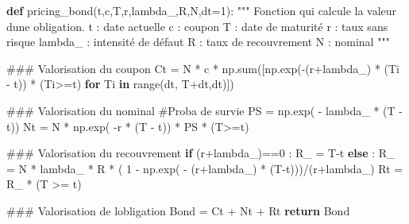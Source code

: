 \documentclass[
  letterpaper,
  DIV=11,
  numbers=noendperiod]{scrartcl}
\newenvironment{Shaded}{\begin{snugshade}}{\end{snugshade}}
\newcommand{\BuiltInTok}[1]{\textcolor[rgb]{0.00,0.23,0.31}{#1}}
\newcommand{\CommentTok}[1]{\textcolor[rgb]{0.37,0.37,0.37}{#1}}
\newcommand{\ControlFlowTok}[1]{\textcolor[rgb]{0.00,0.23,0.31}{\textbf{#1}}}
\newcommand{\DecValTok}[1]{\textcolor[rgb]{0.68,0.00,0.00}{#1}}
\newcommand{\KeywordTok}[1]{\textcolor[rgb]{0.00,0.23,0.31}{\textbf{#1}}}
\newcommand{\NormalTok}[1]{\textcolor[rgb]{0.00,0.23,0.31}{#1}}
\newcommand{\OperatorTok}[1]{\textcolor[rgb]{0.37,0.37,0.37}{#1}}
\begin{document}
\begin{Shaded}
\begin{Highlighting}[]
\KeywordTok{def}\NormalTok{ pricing\_bond(t,c,T,r,lambda\_,R,N,dt}\OperatorTok{=}\DecValTok{1}\NormalTok{):}
    \CommentTok{"""}
\CommentTok{    Fonction qui calcule la valeur d\textquotesingle{}une obligation.}
\CommentTok{    t : date actuelle}
\CommentTok{    c : coupon}
\CommentTok{    T : date de maturité}
\CommentTok{    r : taux sans risque}
\CommentTok{    lambda\_ : intensité de défaut}
\CommentTok{    R : taux de recouvrement}
\CommentTok{    N : nominal}
\CommentTok{    """}

    \CommentTok{\#\#\# Valorisation du coupon}
\NormalTok{    Ct }\OperatorTok{=}\NormalTok{ N }\OperatorTok{*}\NormalTok{ c }\OperatorTok{*}\NormalTok{ np.}\BuiltInTok{sum}\NormalTok{([np.exp(}\OperatorTok{{-}}\NormalTok{(r}\OperatorTok{+}\NormalTok{lambda\_) }\OperatorTok{*}\NormalTok{ (Ti }\OperatorTok{{-}}\NormalTok{ t)) }\OperatorTok{*}\NormalTok{ (Ti}\OperatorTok{\textgreater{}=}\NormalTok{t) }\ControlFlowTok{for}\NormalTok{ Ti }\KeywordTok{in} \BuiltInTok{range}\NormalTok{(dt, T}\OperatorTok{+}\NormalTok{dt,dt)])}

    \CommentTok{\#\#\# Valorisation du nominal}
    \CommentTok{\#Proba de survie}
\NormalTok{    PS }\OperatorTok{=}\NormalTok{ np.exp( }\OperatorTok{{-}}\NormalTok{ lambda\_ }\OperatorTok{*}\NormalTok{ (T }\OperatorTok{{-}}\NormalTok{ t))}
\NormalTok{    Nt }\OperatorTok{=}\NormalTok{ N }\OperatorTok{*}\NormalTok{ np.exp( }\OperatorTok{{-}}\NormalTok{r }\OperatorTok{*}\NormalTok{ (T }\OperatorTok{{-}}\NormalTok{ t)) }\OperatorTok{*}\NormalTok{ PS }\OperatorTok{*}\NormalTok{ (T}\OperatorTok{\textgreater{}=}\NormalTok{t)}

    \CommentTok{\#\#\# Valorisation du recouvrement}
    \ControlFlowTok{if}\NormalTok{ (r}\OperatorTok{+}\NormalTok{lambda\_)}\OperatorTok{==}\DecValTok{0}\NormalTok{ :}
\NormalTok{        R\_ }\OperatorTok{=}\NormalTok{ T}\OperatorTok{{-}}\NormalTok{t}
    \ControlFlowTok{else}\NormalTok{ :}
\NormalTok{        R\_ }\OperatorTok{=}\NormalTok{ N }\OperatorTok{*}\NormalTok{ lambda\_ }\OperatorTok{*}\NormalTok{ R }\OperatorTok{*}\NormalTok{ ( }\DecValTok{1} \OperatorTok{{-}}\NormalTok{ np.exp( }\OperatorTok{{-}}\NormalTok{ (r}\OperatorTok{+}\NormalTok{lambda\_) }\OperatorTok{*}\NormalTok{ (T}\OperatorTok{{-}}\NormalTok{t)))}\OperatorTok{/}\NormalTok{(r}\OperatorTok{+}\NormalTok{lambda\_)}
\NormalTok{    Rt }\OperatorTok{=}\NormalTok{ R\_ }\OperatorTok{*}\NormalTok{ (T }\OperatorTok{\textgreater{}=}\NormalTok{ t)}

    \CommentTok{\#\#\# Valorisation de l\textquotesingle{}obligation}
\NormalTok{    Bond }\OperatorTok{=}\NormalTok{ Ct }\OperatorTok{+}\NormalTok{ Nt }\OperatorTok{+}\NormalTok{ Rt}
    \ControlFlowTok{return}\NormalTok{ Bond}
\end{Highlighting}
\end{Shaded}
\end{document}
